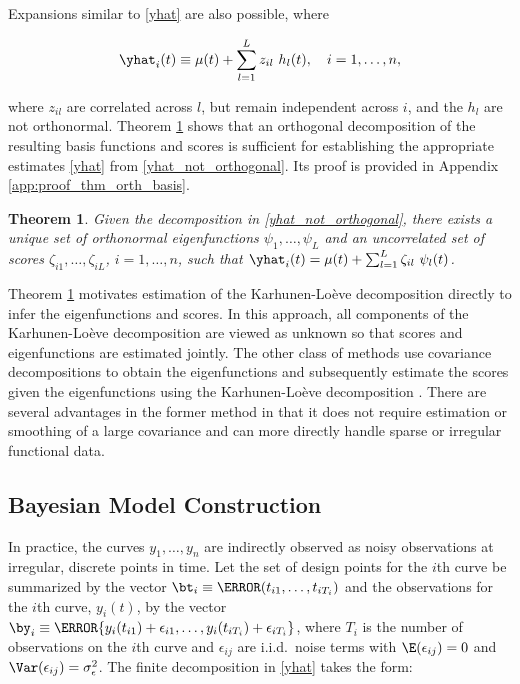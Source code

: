 \documentclass[ba]{imsart}
\numberwithin{equation}{section}
\theoremstyle{plain}
\newtheorem{thm}{Theorem}[section]
\def\sigsqeps{\sigma^2_{\epsilon}}
\begin{document}
Expansions similar to \eqref{yhat} are also possible, where

\begin{equation}
	\yhat_i (t) \equiv \mu (t) + \sum_{l=1}^L z_{il} \ h_l (t), \quad i = 1, \dots, n,
\label{yhat_not_orthogonal}
\end{equation}

\noindent where $z_{il}$ are correlated across $l$, but remain independent across $i$, and the $h_l$ are not
orthonormal. Theorem \ref{thm:orth_basis} shows that an orthogonal decomposition of the resulting basis functions
and scores is sufficient for establishing the appropriate estimates \eqref{yhat} from \eqref{yhat_not_orthogonal}.
Its proof is provided in Appendix \ref{app:proof_thm_orth_basis}.

\begin{thm}
	
	Given the decomposition in \eqref{yhat_not_orthogonal}, there exists a unique set of orthonormal
	eigenfunctions $\psi_1, \dots, \psi_L$ and an uncorrelated set of scores $\zeta_{i1}, \dots, \zeta_{iL}$,
	$i = 1, \dots, n$, such that $\yhat_i (t) = \mu (t) + \sum_{l=1}^L \zeta_{il} \ \psi_l (t)$.
	
\label{thm:orth_basis}
\end{thm}

Theorem \ref{thm:orth_basis} motivates estimation of the Karhunen-Lo\`{e}ve decomposition directly to infer
the eigenfunctions and scores. In this approach, all components of the Karhunen-Lo\`{e}ve decomposition are
viewed as unknown so that scores and eigenfunctions are estimated jointly.
The other class of methods use covariance decompositions to obtain the eigenfunctions
and subsequently estimate the scores given the eigenfunctions using the Karhunen-Lo\`{e}ve decomposition
\citep[e.g.][]{yao05, di09, xiao16}. There are several advantages in the former method in that it does not require
estimation or smoothing of a large covariance and can more directly handle sparse or irregular functional data.


\subsection{Bayesian Model Construction}
\label{sec:bayes_mod}

In practice, the curves $y_1, \dots, y_n$ are indirectly observed as noisy observations at irregular, discrete
points in time.
Let the set of design points for the $i$th curve be summarized by the vector $\bt_i \equiv \T{(t_{i1}, \dots, t_{iT_i})}$
and the observations for the $i$th curve, $y_i (t)$, by the vector $\by_i \equiv \T{\{ y_i (t_{i1}) + \epsilon_{i1}, \dots, y_i
(t_{iT_i}) + \epsilon_{iT_i} \}}$, where $T_i$ is the number of observations on the $i$th curve and
$\epsilon_{ij}$ are i.i.d.\ noise terms with $\E (\epsilon_{ij}) = 0$ and $\Var (\epsilon_{ij}) = \sigsqeps$.
The finite decomposition in \eqref{yhat} takes the form:
\end{document}
